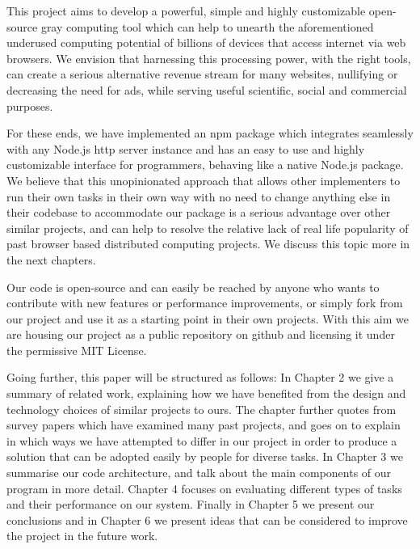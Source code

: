 This project aims to develop a powerful, simple and highly customizable open-source gray computing tool which can help to unearth the aforementioned underused computing potential of billions of devices that access internet via web browsers. We envision that harnessing this processing power, with the right tools, can create a serious alternative revenue stream for many websites, nullifying or decreasing the need for ads, while serving useful scientific, social and commercial purposes.

For these ends, we have implemented an npm package \cite{npm} which integrates seamlessly with any Node.js http server instance \cite{http} and has an easy to use and highly customizable interface for programmers, behaving like a native Node.js package. 
We believe that this unopinionated approach that allows other implementers to run their own tasks in their own way with no need to change anything else in their codebase to accommodate our package is a serious advantage over other similar projects, and can help to resolve the relative lack of real life popularity of past browser based distributed computing projects. We discuss this topic more in the next chapters.

Our code is open-source and can easily be reached by anyone who wants to contribute with new features or performance improvements, or simply fork from our project and use it as a starting point in their own projects. With this aim we are housing our project as a public repository on github and licensing it under the permissive MIT License.


Going further, this paper will be structured as follows: In Chapter 2 we give a summary of related work, explaining how we have benefited from the design and technology choices of similar projects to ours. The chapter further quotes from survey papers which have examined many past projects, and goes on to explain in which ways we have attempted to differ in our project in order to produce a solution that can be adopted easily by people for diverse tasks. In Chapter 3 we summarise our code architecture, and talk about the main components of our program in more detail. Chapter 4 focuses on evaluating different types of tasks and their performance on our system. Finally in Chapter 5 we present our conclusions and in Chapter 6 we present ideas that can be considered to improve the project in the future work.

